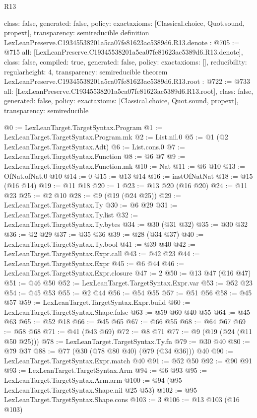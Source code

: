 \begin{lexlean}{R13}
\begin{coremodule}
{  class: false,
  generated: false,
  policy: exact{axioms: [Classical.choice, Quot.sound, propext]},
  transparency: semireducible
}
definition LexLeanPreserve.C19345538201a5ca07fe81623ac5389d6.R13.denote : @705 := @715 {
  all: [LexLeanPreserve.C19345538201a5ca07fe81623ac5389d6.R13.denote],
  class: false,
  compiled: true,
  generated: false,
  policy: exact{axioms: []},
  reducibility: regular{height: 4},
  transparency: semireducible
}
theorem LexLeanPreserve.C19345538201a5ca07fe81623ac5389d6.R13.root : @722 := @733 {
  all: [LexLeanPreserve.C19345538201a5ca07fe81623ac5389d6.R13.root],
  class: false,
  generated: false,
  policy: exact{axioms: [Classical.choice, Quot.sound, propext]},
  transparency: semireducible
}

@0 := LexLeanTarget.TargetSyntax.Program
@1 := LexLeanTarget.TargetSyntax.Program.mk
@2 := List.nil.{0}
@5 := @1 (@2 LexLeanTarget.TargetSyntax.Adt)
@6 := List.cons.{0}
@7 := LexLeanTarget.TargetSyntax.Function
@8 := @6 @7
@9 := LexLeanTarget.TargetSyntax.Function.mk
@10 := Nat
@11 := @6 @10
@13 := OfNat.ofNat.{0} @10
@14 := 0
@15 := @13 @14
@16 := instOfNatNat
@18 := @15 (@16 @14)
@19 := @11 @18
@20 := 1
@23 := @13 @20 (@16 @20)
@24 := @11 @23
@25 := @2 @10
@28 := @9 (@19 (@24 @25))
@29 := LexLeanTarget.TargetSyntax.Ty
@30 := @6 @29
@31 := LexLeanTarget.TargetSyntax.Ty.list
@32 := LexLeanTarget.TargetSyntax.Ty.bytes
@34 := @30 (@31 @32)
@35 := @30 @32
@36 := @2 @29
@37 := @35 @36
@39 := @28 (@34 @37)
@40 := LexLeanTarget.TargetSyntax.Ty.bool
@41 := @39 @40
@42 := LexLeanTarget.TargetSyntax.Expr.call
@43 := @42 @23
@44 := LexLeanTarget.TargetSyntax.Expr
@45 := @6 @44
@46 := LexLeanTarget.TargetSyntax.Expr.closure
@47 := 2
@50 := @13 @47 (@16 @47)
@51 := @46 @50
@52 := LexLeanTarget.TargetSyntax.Expr.var
@53 := @52 @23
@54 := @45 @53
@55 := @2 @44
@56 := @54 @55
@57 := @51 @56
@58 := @45 @57
@59 := LexLeanTarget.TargetSyntax.Expr.build
@60 := LexLeanTarget.TargetSyntax.Shape.false
@63 := @59 @60 @40 @55
@64 := @45 @63
@65 := @52 @18
@66 := @45 @65
@67 := @66 @55
@68 := @64 @67
@69 := @58 @68
@71 := @41 (@43 @69)
@72 := @8 @71
@77 := @9 (@19 (@24 (@11 @50 @25)))
@78 := LexLeanTarget.TargetSyntax.Ty.fn
@79 := @30 @40
@80 := @79 @37
@88 := @77 (@30 (@78 @80 @40) (@79 (@34 @36))) @40
@90 := LexLeanTarget.TargetSyntax.Expr.match @40
@91 := @52 @50
@92 := @90 @91
@93 := LexLeanTarget.TargetSyntax.Arm
@94 := @6 @93
@95 := LexLeanTarget.TargetSyntax.Arm.arm
@100 := @94 (@95 LexLeanTarget.TargetSyntax.Shape.nil @25 @53)
@102 := @95 LexLeanTarget.TargetSyntax.Shape.cons
@103 := 3
@106 := @13 @103 (@16 @103)

\end{coremodule}
\end{lexlean}
